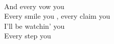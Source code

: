   \songwordfb{~} \\
And every vow you  \songwordfb{~} \\
Every smile you , every claim you  \\
I'll be watchin' you \songwordfb{~} \songwordfb{~} \\
Every step you
